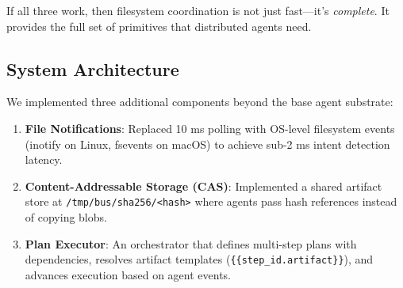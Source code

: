 \documentclass[11pt]{article}
\begin{document}
If all three work, then filesystem coordination is not just fast---it's \emph{complete}. It provides the full set of primitives that distributed agents need.

\subsection{System Architecture}

We implemented three additional components beyond the base agent substrate:

\begin{enumerate}
\item \textbf{File Notifications}: Replaced 10 ms polling with OS-level filesystem events (inotify on Linux, fsevents on macOS) to achieve sub-2 ms intent detection latency.
\item \textbf{Content-Addressable Storage (CAS)}: Implemented a shared artifact store at \texttt{/tmp/bus/sha256/<hash>} where agents pass hash references instead of copying blobs.
\item \textbf{Plan Executor}: An orchestrator that defines multi-step plans with dependencies, resolves artifact templates (\texttt{\{\{step\_id.artifact\}\}}), and advances execution based on agent events.
\end{enumerate}
\end{document}
